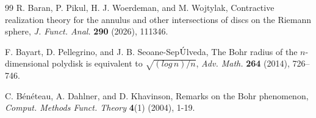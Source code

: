 \documentclass[a4paper,11pt, reqno]{amsart}
\theoremstyle{definition}
\begin{document}
\begin{thebibliography}{99}
	 {\sc R. Baran, P. Pikul, H. J. Woerdeman}, and {\sc M. Wojtylak}, Contractive realization theory for the annulus and other intersections of discs on the Riemann sphere, {\it J. Funct. Anal.} {\bf 290} (2026), 111346.
	
	 {\sc F. Bayart, D. Pellegrino}, and {\sc J. B. Seoane-Sep$\rm \acute{U}$lveda}, The Bohr radius of the $n$-dimensional polydisk is equivalent to $\sqrt{(log \, n)/n}$, {\it Adv. Math.} {\bf 264} (2014), 726--746.
	
	
	
	 {\sc C. B{\'e}n{\'e}teau}, {\sc A. Dahlner}, and {\sc D. Khavinson}, Remarks on the Bohr phenomenon, {\it Comput. Methods Funct. Theory} \textbf{4}(1) (2004), 1-19.
	
	
	
	
	
	
	

\end{thebibliography}
\end{document}
